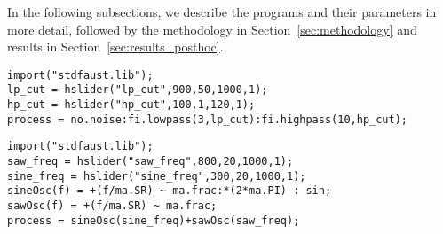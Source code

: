\documentclass[lettersize,journal]{IEEEtran}
\newcommand{\BPNoise}{\textbf{BP-Noise}}
\newcommand{\AddSineSaw}{\textbf{Add-SineSaw}}
\newcommand{\AmpMod}{\textbf{Noise-AM}}
\newcommand{\FMMod}{\textbf{SineSaw-AM}}
\begin{document}
In the following subsections, we describe the programs and their parameters in more detail, followed by the methodology in Section~\ref{sec:methodology} and results in Section~\ref{sec:results_posthoc}.




\begin{lstlisting}[caption={\BPNoise}, label={lst:program0}, language=Faust,
                  float, floatplacement=!H, xleftmargin=1em, xrightmargin=0.5em, firstnumber=0, aboveskip=0em, belowskip=-1em]
import("stdfaust.lib");
lp_cut = hslider("lp_cut",900,50,1000,1);
hp_cut = hslider("hp_cut",100,1,120,1);
process = no.noise:fi.lowpass(3,lp_cut):fi.highpass(10,hp_cut);
\end{lstlisting}

\begin{lstlisting}[caption={\AddSineSaw}, label={lst:program1},language=Faust,float,floatplacement=!H,xleftmargin=1em,xrightmargin=0.5em,firstnumber=0,aboveskip=0em, belowskip=-1em]
import("stdfaust.lib");
saw_freq = hslider("saw_freq",800,20,1000,1);
sine_freq = hslider("sine_freq",300,20,1000,1);
sineOsc(f) = +(f/ma.SR) ~ ma.frac:*(2*ma.PI) : sin;
sawOsc(f) = +(f/ma.SR) ~ ma.frac;
process = sineOsc(sine_freq)+sawOsc(saw_freq);
\end{lstlisting}
\end{document}
